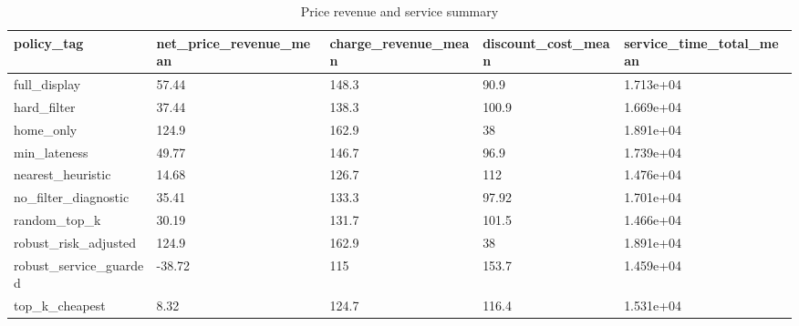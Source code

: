 \begin{table}[ht]
\centering
\begin{tabular}{lllll}
 \hline
policy\_tag & net\_price\_revenue\_mean & charge\_revenue\_mean & discount\_cost\_mean & service\_time\_total\_mean \\
 \hline
full\_display & 57.44 & 148.3 & 90.9 & 1.713e+04 \\
hard\_filter & 37.44 & 138.3 & 100.9 & 1.669e+04 \\
home\_only & 124.9 & 162.9 & 38 & 1.891e+04 \\
min\_lateness & 49.77 & 146.7 & 96.9 & 1.739e+04 \\
nearest\_heuristic & 14.68 & 126.7 & 112 & 1.476e+04 \\
no\_filter\_diagnostic & 35.41 & 133.3 & 97.92 & 1.701e+04 \\
random\_top\_k & 30.19 & 131.7 & 101.5 & 1.466e+04 \\
robust\_risk\_adjusted & 124.9 & 162.9 & 38 & 1.891e+04 \\
robust\_service\_guarded & -38.72 & 115 & 153.7 & 1.459e+04 \\
top\_k\_cheapest & 8.32 & 124.7 & 116.4 & 1.531e+04 \\
 \hline
\end{tabular}
\caption{Price revenue and service summary}
\end{table}
